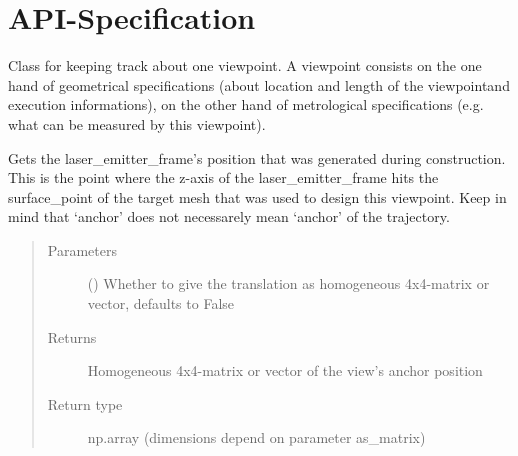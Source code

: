 \documentclass[letterpaper,10pt,english]{sphinxmanual}
\begin{document}
\section{API-Specification}
\label{\detokenize{module_view:module-agiprobot_measurement.viewpoint}}\label{\detokenize{module_view:api-specification}}

\begin{fulllineitems}
\label{\detokenize{module_view:agiprobot_measurement.viewpoint.ViewPoint}}
Class for keeping track about one viewpoint.
A viewpoint consists on the one hand of geometrical specifications (about location and length of the viewpointand execution informations), on the other
hand of metrological specifications (e.g. what can be measured by this viewpoint).

\begin{fulllineitems}
\label{\detokenize{module_view:agiprobot_measurement.viewpoint.ViewPoint.get_anchor_position}}
Gets the laser\_emitter\_frame’s position that was generated during construction. This is the point where the z-axis of the laser\_emitter\_frame
hits the surface\_point of the target mesh that was used to design this viewpoint. Keep in mind that ‘anchor’ does not necessarely mean ‘anchor’ of the trajectory.
\begin{quote}\begin{description}
\item[{Parameters}] \leavevmode
{} (\sphinxstyleliteralemphasis{, }) \textendash{} Whether to give the translation as homogeneous 4x4-matrix or vector, defaults to False

\item[{Returns}] \leavevmode
Homogeneous 4x4-matrix or vector of the view’s anchor position

\item[{Return type}] \leavevmode
np.array (dimensions depend on parameter as\_matrix)


\end{description}
\end{quote}
\end{fulllineitems}
\end{fulllineitems}
\end{document}

